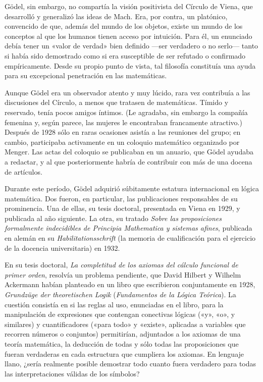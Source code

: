 \documentclass[a4paper, 12pt]{article}
\begin{document}
Gödel, sin embargo, no compartía la visión positivista del Círculo de Viena, que desarrolló y generalizó las ideas de Mach. Era, por contra, un platónico, convencido de que, además del mundo de los objetos, existe un mundo de los conceptos al que los humanos tienen acceso por intuición. Para él, un enunciado debía tener un «valor de verdad» bien definido ---ser verdadero o no serlo--- tanto si había sido demostrado como si era susceptible de ser refutado o confirmado empíricamente. Desde su propio punto de vista, tal filosofía constituía una ayuda para su excepcional penetración en las matemáticas.

Aunque Gödel era un observador atento y muy lúcido, rara vez contribuía a las discusiones del Círculo, a menos que tratasen de matemáticas. Tímido y reservado, tenía pocos amigos íntimos. (Le agradaba, sin embargo la compañía femenina y, según parece, las mujeres le encontraban francamente atractivo.) Después de 1928 sólo en raras ocasiones asistía a las reuniones del grupo; en cambio, participaba activamente en un coloquio matemático organizado por Menger. Las actas del coloquio se publicaban en un anuario, que Gödel ayudaba a redactar, y al que posteriormente habría de contribuir con más de una docena de artículos.

Durante este período, Gödel adquirió súbitamente estatura internacional en lógica matemática. Dos fueron, en particular, las publicaciones responsables de su prominencia. Una de ellas, su tesis doctoral, presentada en Viena en 1929, y publicada al año siguiente. La otra, su tratado {\it Sobre las proposiciones formalmente indecidibles de Principia Mathematica y sistemas afines}, publicada en alemán en su {\it Habilitationsschrift} (la memoria de cualificación para el ejercicio de la docencia universitaria) en 1932.

En su tesis doctoral, {\it La completitud de los axiomas del cálculo funcional de primer orden}, resolvía un problema pendiente, que David Hilbert y Wilhelm Ackermann habían planteado en un libro que escribieron conjuntamente en 1928, {\it Grundzüge der theoretischen Logik} ({\it Fundamentos de la Lógica Teórica}). La cuestión consistía en si las reglas al uso, enunciadas en el libro, para la manipulación de expresiones que contengan conectivas lógicas («y», «o», y similares) y cuantificadores («para todo» y «existe», aplicadas a variables que recorren números o conjuntos) permitirían, adjuntados a los axiomas de una teoría matemática, la deducción de todas y sólo todas las proposiciones que fueran verdaderas en cada estructura que cumpliera los axiomas. En lenguaje llano, ¿sería realmente posible demostrar todo cuanto fuera verdadero para todas las interpretaciones válidas de los símbolos?
\end{document}

